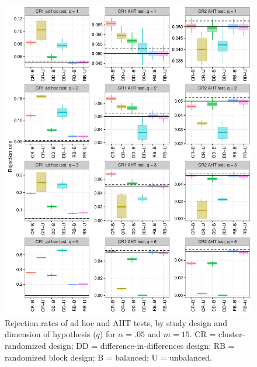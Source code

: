 \documentclass{article}\usepackage[]{graphicx}\usepackage[]{color}
\newenvironment{knitrout}{}{} %
\begin{document}
\begin{knitrout}
\color{fgcolor}\begin{figure}[H]

{\centering \includegraphics[width=\linewidth]{CR_fig/balance_05_15-1} 

}

\caption[Rejection rates of ad hoc and AHT tests, by study design and dimension of hypothesis (]{Rejection rates of ad hoc and AHT tests, by study design and dimension of hypothesis ($q$) for $\alpha = .05$ and $m = 15$. CR = cluster-randomized design; DD = difference-in-differences design; RB = randomized block design; B = balanced; U = unbalanced.}\label{fig:balance_05_15}
\end{figure}


\end{knitrout}
\end{document}
